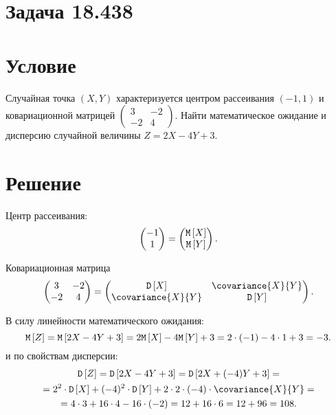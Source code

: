 \documentclass[a4paper,12pt]{article}
\begin{document}
    \section{Задача 18.438}
    \section*{Условие}
    Случайная точка $\left ( X, Y \right )$ характеризуется центром рассеивания $(-1, 1)$ и ковариационной матрицей
    $\begin{pmatrix}
         3  & -2 \\
         -2 & 4
    \end{pmatrix}$.
    Найти математическое ожидание и дисперсию случайной величины $Z = 2 X - 4 Y + 3$.

    \section*{Решение}
    Центр рассеивания:
    \begin{equation}
        \begin{pmatrix}
            -1 \\
            1
        \end{pmatrix}
        =
        \begin{pmatrix}
            \mathtt{M} \left [ X \right ] \\
            \mathtt{M} \left [ Y \right ]
        \end{pmatrix}
        .
    \end{equation}

    Ковариационная матрица
    \begin{equation}
        \begin{pmatrix}
            3  & -2 \\
            -2 & 4
        \end{pmatrix}
        =
        \begin{pmatrix}
            \variance{X}      & \covariance{X}{Y} \\
            \covariance{X}{Y} & \variance{Y}
        \end{pmatrix}
        .
    \end{equation}

    В силу линейности математического ожидания:
    \begin{equation}
        \mathtt{M} \left [ Z \right ]
        = \mathtt{M} \left [ 2X - 4 Y + 3 \right ]
        = 2 \mathtt{M} \left [ X \right ] - 4 \mathtt{M} \left [ Y \right ] + 3
        = 2 \cdot (-1) - 4 \cdot 1 + 3
        = -3
        .
    \end{equation}
    и по свойствам дисперсии:
    \begin{multline}
        \variance{Z}
        = \variance{2 X - 4 Y + 3}
        = \variance{2 X + (-4) Y + 3} = \\
        = 2^2 \cdot \variance{X} + (-4)^2 \cdot \variance{Y} + 2 \cdot 2 \cdot (-4) \cdot \covariance{X}{Y} = \\
        = 4 \cdot 3 + 16 \cdot 4 - 16 \cdot (-2)
        = 12 + 16 \cdot 6
        = 12 + 96
        = 108.
    \end{multline}
\end{document}
